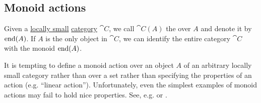 \subsection{Monoid actions}\label{subsec:monoid_actions}

\begin{definition}\label{def:endomorphism_monoid}
  Given a \hyperref[def:category_size]{locally small} \hyperref[def:category]{category} \( \cat{C} \), we call \( \cat{C}(A) \) the  over \( A \) and denote it by \( \operatorname{end}(A) \). If \( A \) is the only object in \( \cat{C} \), we can identify the entire category \( \cat{C} \) with the monoid \( \operatorname{end}(A) \).
\end{definition}

\begin{remark}\label{rem:monoid_action_endomorphisms}
  It is tempting to define a monoid action over an object \( A \) of an arbitrary locally small category rather than over a set rather than specifying the properties of an action (e.g. \enquote{linear action}). Unfortunately, even the simplest examples of monoid actions may fail to hold nice properties. See, e.g.  or .
\end{remark}

